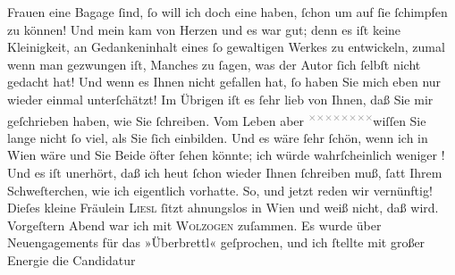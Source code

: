 \begin{ledgroupsized}[t]{13cm}
               Frauen eine Bagage ſind, ſo will ich doch eine haben, ſchon um auf {\pb}ſie ſchimpfen zu können! Und mein \label{K_L03525-3v}\label{K_L03525-3h} kam von Herzen und es war gut; denn es
               iſt \strikeout{\textcolor{gray}{Ar}} keine Kleinigkeit, an Gedankeninhalt eines ſo gewaltigen Werkes zu entwickeln,
               zumal wenn man gezwungen iſt, Manches zu ſagen, was der Autor ſich ſelbſt nicht gedacht hat! Und
               wenn es Ihnen  nicht gefallen hat, ſo haben Sie mich eben nur wieder einmal unterſchätzt! Im
               Übrigen iſt es  ſehr lieb
               von Ihnen, daß Sie mir geſchrieben haben, wie Sie ſchreiben. Vom Leben aber {\pb}\substVorne{}\textsuperscript{\textcolor{gray}{×}\-\textcolor{gray}{×}\-\textcolor{gray}{×}\-\textcolor{gray}{×}\-\textcolor{gray}{×}\-\textcolor{gray}{×}\-\textcolor{gray}{×}\-\textcolor{gray}{×}}\substDazwischen{}wiſſen\substHinten{} Sie lange nicht ſo viel, als Sie ſich einbilden. Und es wäre ſehr ſchön,
               wenn ich in Wien wäre und Sie Beide öfter ſehen könnte; ich würde
               wahrſcheinlich weniger \label{K_L03525-4v}\label{K_L03525-4h}! Und es iſt unerhört, daß ich heut ſchon
               wieder Ihnen ſchreiben muß, ſatt Ihrem Schweſterchen, wie ich eigentlich vorhatte.\pend
           \pstart
           So, und jetzt reden wir vernünftig!\pend
           \pstart
           Dieſes kleine Fräulein \textsc{Liesl} ſitzt ahnungslos in Wien und weiß nicht, daß
                  \label{K_L03525-5v}\label{K_L03525-5h} wird. Vorgeſtern{ }Abend war ich mit \textsc{Wolzogen} zuſammen. Es wurde über Neuengagements für das »Überbrettl« geſprochen, und ich ſtellte mit großer Energie die Candidatur

\end{ledgroupsized}
